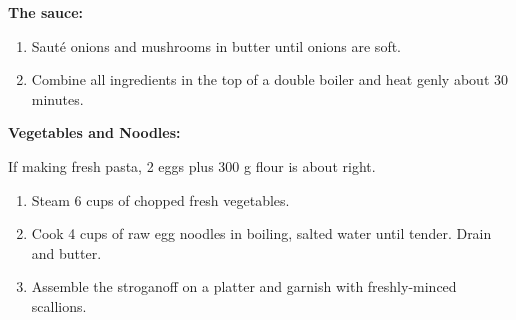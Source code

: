 

\textbf{The sauce:}

\begin{ingredients}
\end{ingredients}


\begin{recipe}
  \begin{enumerate}

  \item Saut\'e onions and mushrooms in butter until onions are soft.

  \item Combine all ingredients in the top of a double boiler and heat
    genly about 30 minutes.

  \end{enumerate}
\end{recipe}


\textbf{Vegetables and Noodles:}

\begin{ingredients}
\end{ingredients}

If making fresh pasta, 2 eggs plus 300 g flour is about right.


\begin{recipe}
  \begin{enumerate}

  \item Steam 6 cups of chopped fresh vegetables.

  \item Cook 4 cups of raw egg noodles in boiling, salted water until
    tender.  Drain and butter.

  \item Assemble the stroganoff on a platter and garnish with
    freshly-minced scallions.

  \end{enumerate}
\end{recipe}

